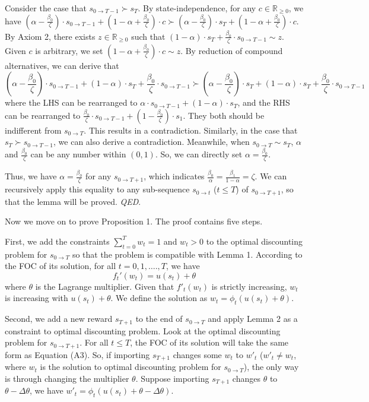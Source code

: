 Consider the case that \(s_{0 \rightarrow T-1} \succ s_T\). By
state-independence, for any \(c\in \mathbb{R}_{\geq 0}\), we have
\((\alpha - \frac{\beta_0}{\zeta})\cdot s_{0\rightarrow T-1} + (1-\alpha+\frac{\beta_0}{\zeta})\cdot c \succ (\alpha - \frac{\beta_0}{\zeta})\cdot s_T + (1-\alpha+\frac{\beta_0}{\zeta})\cdot c\).
By Axiom 2, there exists \(z\in \mathbb{R}_{\geq 0}\) such that
\((1-\alpha)\cdot s_T + \frac{\beta_0}{\zeta}\cdot s_{0\rightarrow T-1}\sim z\).
Given \(c\) is arbitrary, we set
\((1-\alpha+\frac{\beta_0}{\zeta})\cdot c \sim z\). By reduction of
compound alternatives, we can derive that\[
(\alpha-\frac{\beta_0}{\zeta})\cdot s_{0\rightarrow T-1} +(1-\alpha)\cdot s_T + \frac{\beta_0}{\zeta}\cdot s_{0\rightarrow T-1} \succ (\alpha-\frac{\beta_0}{\zeta})\cdot s_T +(1-\alpha)\cdot s_T + \frac{\beta_0}{\zeta}\cdot s_{0\rightarrow T-1}
\]where the LHS can be rearranged to
\(\alpha\cdot s_{0\rightarrow T-1} + (1-\alpha)\cdot s_T\), and the RHS
can be rearranged to
\(\frac{\beta_0}{\zeta}\cdot s_{0 \rightarrow T-1} + (1-\frac{\beta_0}{\zeta})\cdot s_1\).
They both should be indifferent from \(s_{0\rightarrow T}\). This
results in a contradiction. Similarly, in the case that
\(s_T \succ s_{0 \rightarrow T-1}\), we can also derive a contradiction.
Meanwhile, when \(s_{0\rightarrow T}\sim s_T\), \(\alpha\) and
\(\frac{\beta_0}{\zeta}\) can be any number within \((0,1)\). So, we can
directly set \(\alpha = \frac{\beta_0}{\zeta}\).

Thus, we have \(\alpha = \frac{\beta_0}{\zeta}\) for any
\(s_{0\rightarrow T+1}\), which indicates
\(\frac{\beta_0}{\alpha}=\frac{\beta_1}{1-\alpha}=\zeta\). We can
recursively apply this equality to any sub-sequence
\(s_{0\rightarrow t}\) (\(t\leq T\)) of \(s_{0\rightarrow T+1}\), so
that the lemma will be proved. \emph{QED}.

Now we move on to prove Proposition 1. The proof contains five steps.

First, we add the constraints \(\sum_{t=0}^T w_t=1\) and \(w_t>0\) to
the optimal discounting problem for \(s_{0\rightarrow T}\) so that the
problem is compatible with Lemma 1. According to the FOC of its
solution, for all \(t=0,1,….,T\), we have\[\tag{A3}
f_t'(w_t)=u(s_t)+\theta
\]where \(\theta\) is the Lagrange multiplier. Given that \(f'_t(w_t)\)
is strictly increasing, \(w_t\) is increasing with \(u(s_t)+\theta\). We
define the solution as \(w_t =\phi_t(u(s_t)+\theta)\).

Second, we add a new reward \(s_{T+1}\) to the end of
\(s_{0\rightarrow T}\) and apply Lemma 2 as a constraint to optimal
discounting problem. Look at the optimal discounting problem for
\(s_{0\rightarrow T+1}\). For all \(t\leq T\), the FOC of its solution
will take the same form as Equation (A3). So, if importing \(s_{T+1}\)
changes some \(w_t\) to \(w'_t\) (\(w'_t \neq w_t\), where \(w_t\) is
the solution to optimal discounting problem for \(s_{0\rightarrow T}\)),
the only way is through changing the multiplier \(\theta\). Suppose
importing \(s_{T+1}\) changes \(\theta\) to \(\theta-\Delta \theta\), we
have \(w'_t = \phi_t(u(s_t)+\theta-\Delta \theta)\).

